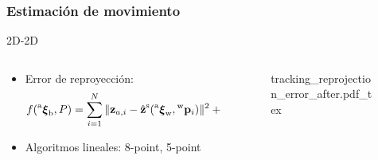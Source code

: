 \begin{frame}
	\frametitle{Estimación de movimiento}
	\footnotesize
	
	2D-2D
    \begin{columns}
	\begin{column}{0.7\textwidth}
		\begin{itemize}
		\item Error de reproyección:
		\[
		f(\prescript{\mathrm{a}}{}{{\boldsymbol{\mathbf{\xi}}}_\mathrm{b}}, P)= \sum_{i=1}^{N} \Vert \boldsymbol{\mathbf{z}}_{a,i} - \hat{\boldsymbol{\mathbf{z}}}^{\mathrm{s}}(\prescript{\mathrm{a}}{}{{\boldsymbol{\mathbf{\xi}}}_\mathrm{\mathrm{w}}},\prescript{\mathrm{\mathrm{w}}}{}{\boldsymbol{\mathbf{p}}}_{i}) \Vert^{2} + \Vert \boldsymbol{\mathbf{z}}_{b,i} - \hat{\boldsymbol{\mathbf{z}}}^{\mathrm{s}}({\prescript{\mathrm{a}}{}{{\boldsymbol{\mathbf{\xi}}}_\mathrm{b}}}^{-1}\prescript{\mathrm{a}}{}{{\boldsymbol{\mathbf{\xi}}}_\mathrm{\mathrm{w}}},\prescript{\mathrm{\mathrm{w}}}{}{\boldsymbol{\mathbf{p}}}_{i}) \Vert^{2}
		\]
		\item Algoritmos lineales: 8-point, 5-point
		\end{itemize}
	\end{column}
	\begin{column}{0.3\textwidth}
	    \begin{figure}
			\def\svgwidth{\columnwidth}
			{tracking_reprojection_error_after.pdf_tex}
		\end{figure}
	\end{column}
	\end{columns}


\end{frame}
